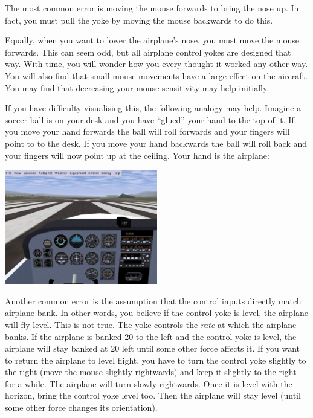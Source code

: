 \begin{itemize}
The most common error is moving the mouse forwards to bring the nose up. In
fact, you must pull the yoke by moving the mouse backwards to do this.

Equally, when you want to lower the airplane's nose, you must move
the mouse forwards. This can seem odd, but all airplane control yokes
are designed that way. With time, you will wonder how you every thought it
worked any other way.  You will also find that
small mouse movements have a large effect on the aircraft. You may find that
decreasing your mouse sensitivity may help initially.

If you have difficulty visualising this, the following analogy may help.
Imagine a soccer ball is on your desk and you have ``glued'' your hand
to the top of it. If you move your hand forwards the ball will roll forwards
and your fingers will point to to the desk. If you move your hand backwards the
ball will roll  back and your fingers will now point up at the ceiling.
Your hand is the airplane:


\begin{center}
\includegraphics[width=0.5\textwidth]{img/tut_6}
\end{center}

Another common error is the assumption that the control inputs directly
match airplane bank. In other words, you believe if the control yoke is
level, the airplane will fly level. This is not true. The yoke
controls the \emph{rate} at which the airplane banks. If the airplane is
banked 20\textdegree{} to the left and the control yoke is level, the
airplane will stay banked at 20\textdegree{} left until some other force
affects it. If you want to return the airplane to level flight, you have to
turn the control yoke slightly to the right (move the mouse slightly
rightwards) and keep it slightly to the right for a while. The airplane
will turn slowly rightwards. Once it is level with the horizon, bring the
control yoke level too. Then the airplane will stay level (until some other
force changes its orientation).


\end{itemize}
